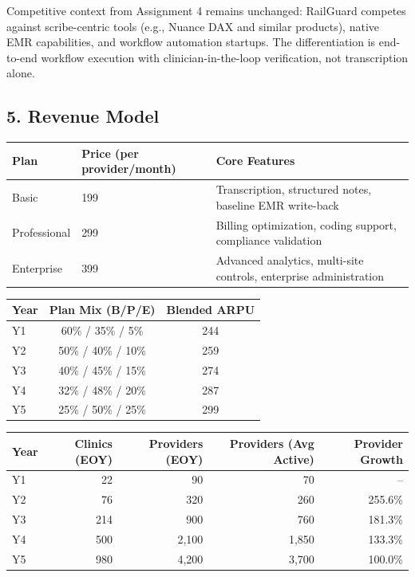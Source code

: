 \documentclass[11pt]{article}
\begin{document}
Competitive context from Assignment 4 remains unchanged: RailGuard competes against scribe-centric tools (e.g., Nuance DAX and similar products), native EMR capabilities, and workflow automation startups. The differentiation is end-to-end workflow execution with clinician-in-the-loop verification, not transcription alone.

\subsection*{5. Revenue Model}
\begin{center}
\begin{tabular}{p{} p{} p{}}
\toprule
\textbf{Plan} & \textbf{Price (per provider/month)} & \textbf{Core Features} \\
\midrule
Basic & 199 & Transcription, structured notes, baseline EMR write-back \\
Professional & 299 & Billing optimization, coding support, compliance validation \\
Enterprise & 399 & Advanced analytics, multi-site controls, enterprise administration \\
\bottomrule
\end{tabular}
\end{center}

\begin{center}
\begin{tabular}{lcc}
\toprule
\textbf{Year} & \textbf{Plan Mix (B/P/E)} & \textbf{Blended ARPU} \\
\midrule
Y1 & 60\% / 35\% / 5\% & 244 \\
Y2 & 50\% / 40\% / 10\% & 259 \\
Y3 & 40\% / 45\% / 15\% & 274 \\
Y4 & 32\% / 48\% / 20\% & 287 \\
Y5 & 25\% / 50\% / 25\% & 299 \\
\bottomrule
\end{tabular}
\end{center}

\begin{center}
\begin{tabular}{lrrrr}
\toprule
\textbf{Year} & \textbf{Clinics (EOY)} & \textbf{Providers (EOY)} & \textbf{Providers (Avg Active)} & \textbf{Provider Growth} \\
\midrule
Y1 & 22 & 90 & 70 & -- \\
Y2 & 76 & 320 & 260 & 255.6\% \\
Y3 & 214 & 900 & 760 & 181.3\% \\
Y4 & 500 & 2,100 & 1,850 & 133.3\% \\
Y5 & 980 & 4,200 & 3,700 & 100.0\% \\
\bottomrule
\end{tabular}
\end{center}
\end{document}
